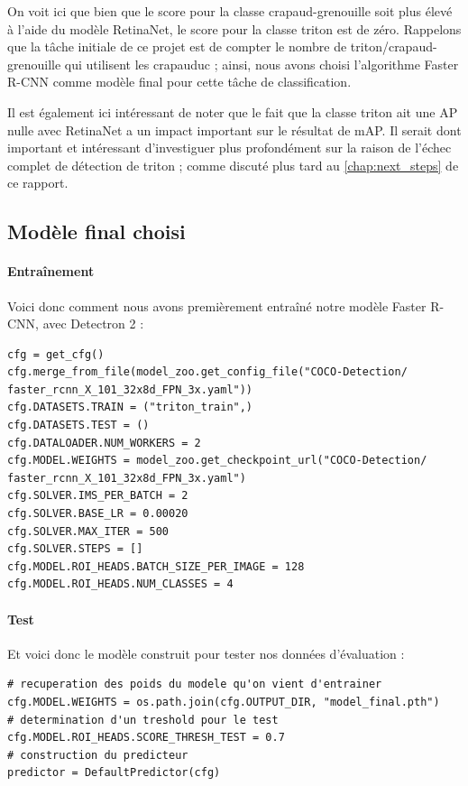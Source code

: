 On voit ici que bien que le score pour la classe crapaud-grenouille soit plus élevé à l'aide du modèle RetinaNet, le score pour la classe triton est de zéro. Rappelons que la tâche initiale de ce projet est de compter le nombre de triton/crapaud-grenouille qui utilisent les crapauduc ; ainsi, nous avons choisi l'algorithme Faster R-CNN comme modèle final pour cette tâche de classification.\newline

Il est également ici intéressant de noter que le fait que la classe triton ait une AP nulle avec RetinaNet a un impact important sur le résultat de mAP. Il serait dont important et intéressant d'investiguer plus profondément sur la raison de l'échec complet de détection de triton ; comme discuté plus tard au \ref{chap:next_steps} de ce rapport.

\subsection{Modèle final choisi}\label{anal:final_model}

\paragraph{Entraînement}

Voici donc comment nous avons premièrement entraîné notre modèle Faster R-CNN, avec Detectron 2 : 

\lstset{language=Python}
\lstset{style=Python}
\begin{lstlisting}
cfg = get_cfg()
cfg.merge_from_file(model_zoo.get_config_file("COCO-Detection/
faster_rcnn_X_101_32x8d_FPN_3x.yaml"))
cfg.DATASETS.TRAIN = ("triton_train",)
cfg.DATASETS.TEST = ()
cfg.DATALOADER.NUM_WORKERS = 2
cfg.MODEL.WEIGHTS = model_zoo.get_checkpoint_url("COCO-Detection/
faster_rcnn_X_101_32x8d_FPN_3x.yaml")  
cfg.SOLVER.IMS_PER_BATCH = 2 
cfg.SOLVER.BASE_LR = 0.00020 
cfg.SOLVER.MAX_ITER = 500 
cfg.SOLVER.STEPS = []   
cfg.MODEL.ROI_HEADS.BATCH_SIZE_PER_IMAGE = 128  
cfg.MODEL.ROI_HEADS.NUM_CLASSES = 4 
\end{lstlisting}


\paragraph{Test}

Et voici donc le modèle construit pour tester nos données d'évaluation : 

\lstset{style=Python}
\begin{lstlisting}
# recuperation des poids du modele qu'on vient d'entrainer
cfg.MODEL.WEIGHTS = os.path.join(cfg.OUTPUT_DIR, "model_final.pth")  
# determination d'un treshold pour le test
cfg.MODEL.ROI_HEADS.SCORE_THRESH_TEST = 0.7  
# construction du predicteur
predictor = DefaultPredictor(cfg)
\end{lstlisting}

